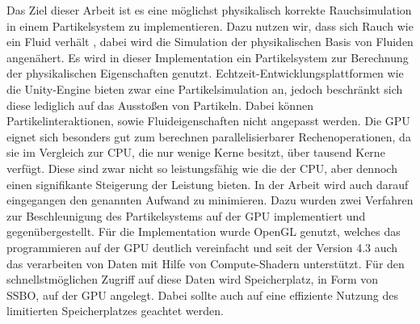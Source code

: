 \documentclass[intern,palatino]{cgBA}
\begin{document}
Das Ziel dieser Arbeit ist es eine möglichst physikalisch korrekte Rauchsimulation in einem Partikelsystem zu implementieren. Dazu nutzen wir, dass sich Rauch wie ein Fluid verhält \cite{stam2003real}, dabei wird die Simulation der physikalischen Basis von Fluiden angenähert. Es wird in dieser Implementation ein Partikelsystem zur Berechnung der physikalischen Eigenschaften genutzt. Echtzeit-Entwicklungsplattformen wie die Unity-Engine bieten zwar eine Partikelsimulation an, jedoch beschränkt sich diese lediglich auf das Ausstoßen von Partikeln. Dabei können Partikelinteraktionen, sowie Fluideigenschaften nicht angepasst werden.
\newline
Die GPU eignet sich besonders gut zum berechnen parallelisierbarer Rechenoperationen, da sie im Vergleich zur CPU, die nur wenige Kerne besitzt, über tausend Kerne verfügt. Diese sind zwar nicht so leistungsfähig wie die der CPU, aber dennoch einen signifikante Steigerung der Leistung bieten.
\newline
In der Arbeit wird auch darauf eingegangen den genannten Aufwand zu minimieren. Dazu wurden zwei Verfahren zur Beschleunigung des Partikelsystems auf der GPU implementiert und gegenübergestellt.
\newline
Für die Implementation wurde OpenGL genutzt, welches das programmieren auf der GPU deutlich vereinfacht und seit der Version 4.3 auch das verarbeiten von Daten mit Hilfe von Compute-Shadern unterstützt. Für den schnellstmöglichen Zugriff auf diese Daten wird Speicherplatz, in Form von SSBO, auf der GPU angelegt. Dabei sollte auch auf eine effiziente Nutzung des limitierten Speicherplatzes geachtet werden.

\end{document}
